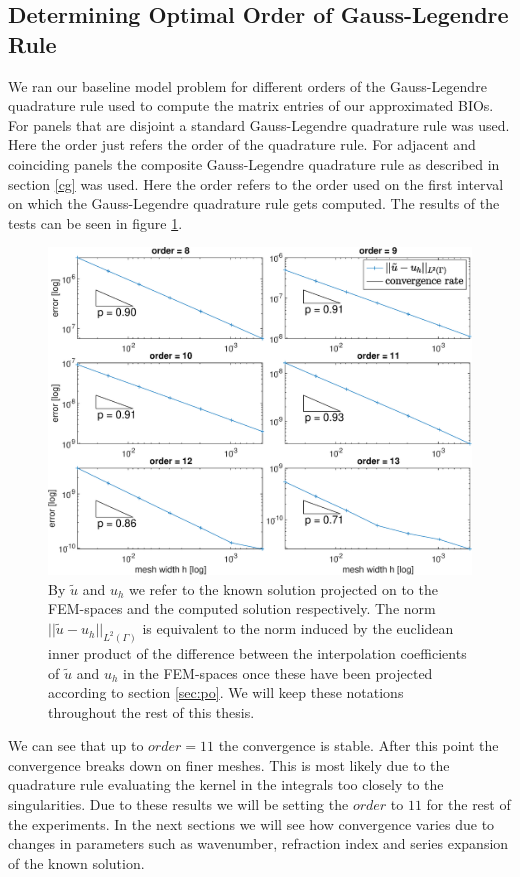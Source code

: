 \documentclass[a4paper, oneside]{thirdparty_stylesheets/discothesis}
\begin{document}
\subsection{Determining Optimal Order of Gauss-Legendre Rule}
We ran our baseline model problem for different orders of the Gauss-Legendre quadrature rule used to compute the matrix entries of our approximated BIOs.
For panels that are disjoint a standard Gauss-Legendre quadrature rule was used.
Here the order just refers the order of the quadrature rule.
For adjacent and coinciding panels the composite Gauss-Legendre quadrature rule as described in section \ref{cg} was used.
Here the order refers to the order used on the first interval on which the Gauss-Legendre quadrature rule gets computed. 
The results of the tests can be seen in figure \ref{fig:order}.
\begin{figure} [!ht]
	\centering
	\includegraphics[width=\columnwidth]{figures/order.eps}
	\caption{ By $\tilde{u}$ and $u_h$ we refer to the known solution projected on to the FEM-spaces and the computed solution respectively.
		The norm $||\tilde{u}-u_h||_{L^2(\Gamma)}$ is equivalent to the norm induced by the euclidean inner product of the difference between the interpolation coefficients of $\tilde{u}$ and $u_h$ in the FEM-spaces once these have been projected according to section \ref{sec:po}.
		We will keep these notations throughout the rest of this thesis.
	}
	\label{fig:order}
\end{figure}
We can see that up to $order=11$ the convergence is stable. 
After this point the convergence breaks down on finer meshes.
This is most likely due to the quadrature rule evaluating the kernel in the integrals too closely to the singularities.
Due to these results we will be setting the $order$ to $11$ for the rest of the experiments.
In the next sections we will see how convergence varies due to changes in parameters such as wavenumber, refraction index and series expansion of the known solution.
\end{document}
